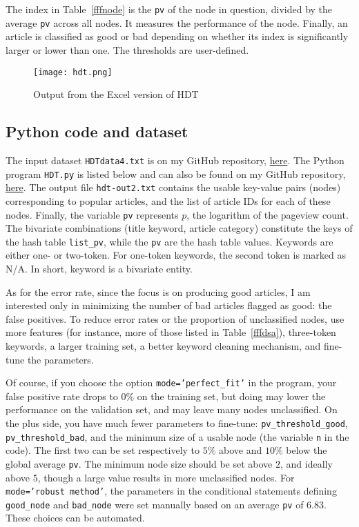 \documentclass[oneside,10pt]{book}
\begin{document}
The index in Table~\ref{fffnode} is the \texttt{pv} of the node in question, divided by the average \texttt{pv} across all nodes. It measures the performance of the node. Finally, an article is classified as good or bad depending on whether its index is significantly larger or lower than one. The thresholds are user-defined. 


\begin{figure}%
\centering
\texttt{[image: hdt.png]}
\caption{Output from the Excel version of HDT}
\label{fig:hdt}
\end{figure}



\subsection{Python code and dataset}\label{pythourew}


The input dataset \texttt{HDTdata4.txt} is on my GitHub repository, \href{https://github.com/VincentGranville/Machine-Learning/blob/main/Source\%20Code/HDTdata4.txt}{here}. The Python program \texttt{HDT.py} is listed below and can also be found on my GitHub repository, \href{https://github.com/VincentGranville/Machine-Learning/blob/main/Source\%20Code/HDT.py}{here}. The output file \texttt{hdt-out2.txt} contains the usable key-value pairs (nodes) corresponding to popular articles, and the list of article IDs for each of these nodes. Finally, the variable \texttt{pv} represents $p$, the logarithm of the pageview count. The bivariate combinations (title keyword, article category)  constitute the
 keys of the hash table \texttt{list\_pv}, while the \texttt{pv} are the hash table values. Keywords are either one- or two-token. For one-token keywords, the second token is marked as N/A. In short, keyword is a bivariate entity.

As for the error rate, since the focus is on producing good articles, I am interested only in minimizing the number of bad articles flagged as good: the false positives.  To reduce error rates or the proportion of unclassified nodes, use more features (for instance, more of those listed in Table~\ref{fffdsa}), three-token keywords, a larger training set, a better keyword cleaning mechanism, and fine-tune the parameters. 

Of course, if you choose the option \texttt{mode='perfect\_fit'} in the program, your false positive rate drops to $0\%$ on the training set, but doing may lower the
 performance on the \textcolor{index}{validation set}, and may leave many nodes unclassified.  On the plus side, you have much fewer parameters to fine-tune:
 \texttt{pv\_threshold\_good}, \texttt{pv\_threshold\_bad}, and the minimum size of a usable node (the variable \texttt{n} in the code). The first two can be set respectively to $5\%$ above and 
$10\%$ below 
 the global average \texttt{pv}. The minimum node size should be set above $2$, and ideally above $5$, though a large value results in more unclassified nodes.
 For \texttt{mode='robust method'}, the
 parameters in the conditional statements defining \texttt{good\_node} and \texttt{bad\_node} were set manually based on an average \texttt{pv} of $6.83$. These choices can be automated.
\end{document}
